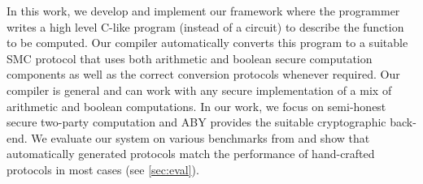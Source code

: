 
In this work, we develop and implement our framework \tool where the programmer writes a high level C-like program (instead of a circuit) to describe the function to be computed. Our compiler automatically converts this program to a suitable SMC protocol that uses both arithmetic and boolean secure computation components as well as the correct conversion protocols whenever required. Our compiler is general and can work with any secure implementation of a mix of arithmetic and boolean computations. In our work, we focus on semi-honest secure two-party computation and  ABY \cite{aby} provides the suitable cryptographic back-end.  We evaluate our system on various benchmarks from \cite{} and show that automatically generated protocols match the performance of hand-crafted protocols in most cases (see \ref{sec:eval}). 



